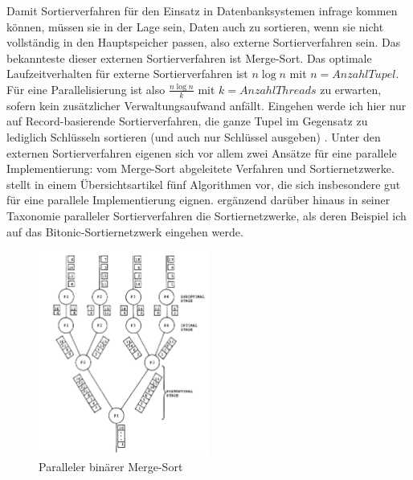 \documentclass[a4paper,12pt,twoside]{article}
\begin{document}
{Damit Sortierverfahren für den Einsatz in Datenbanksystemen infrage kommen können, müssen sie in der Lage sein, Daten auch zu sortieren, wenn sie nicht vollständig in den Hauptspeicher passen, also externe Sortierverfahren sein. Das bekannteste dieser externen Sortierverfahren ist Merge-Sort. Das optimale Laufzeitverhalten für externe Sortierverfahren ist $ n \log n $ mit $n = Anzahl Tupel$. Für eine Parallelisierung ist also $ \frac{n \log n} {k} $ mit $k = Anzahl Threads$ zu erwarten, sofern kein zusätzlicher Verwaltungsaufwand anfällt. Eingehen werde ich hier nur auf Record-basierende Sortierverfahren, die ganze Tupel im Gegensatz zu lediglich Schlüsseln sortieren (und auch nur Schlüssel ausgeben) \parencite{Salzberg1990}. Unter den externen Sortierverfahren eigenen sich vor allem zwei Ansätze für eine parallele Implementierung: vom Merge-Sort abgeleitete Verfahren und Sortiernetzwerke. {\textcite[S. 831ff]{Taniar2000}} stellt in einem Übersichtsartikel fünf Algorithmen vor, die sich insbesondere gut für eine parallele Implementierung eignen. {\textcite[S. 9ff] {Bitton1984}} ergänzend darüber hinaus in seiner Taxonomie paralleler Sortierverfahren die Sortiernetzwerke, als deren Beispiel ich auf das Bitonic-Sortiernetzwerk eingehen werde.

\begin{figure}
	\centering
	\includegraphics[width=0.5\textwidth]{Bilder/b-merge-sort.png}
	\caption{Paralleler binärer Merge-Sort \parencite[S. 334]{Bitton1983}}
	\label{img:bMergeSort}
\end{figure}

}
\end{document}
